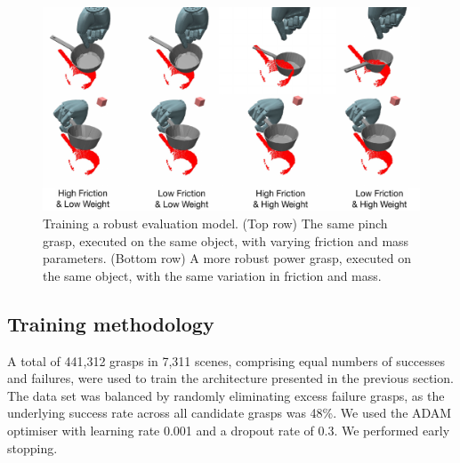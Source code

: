 \begin{figure}[t]
\includegraphics[width=\columnwidth]{images/frictionweight}
\caption{Training a robust evaluation model. (Top row) The same pinch grasp, executed on the same object, with varying friction and mass parameters. (Bottom row) A more robust power grasp, executed on the same object, with the same variation in friction and mass. \label{fig:evaluative-training}}
\end{figure}

\subsection{Training methodology}
A total of 441,312 grasps in 7,311 scenes, comprising equal numbers of successes and failures, were used to train the architecture presented in the previous section. The data set was balanced by randomly eliminating excess failure grasps, as the underlying success rate across all candidate grasps was 48\%. We used the ADAM optimiser with learning rate 0.001 and a dropout rate of 0.3. We performed early stopping.